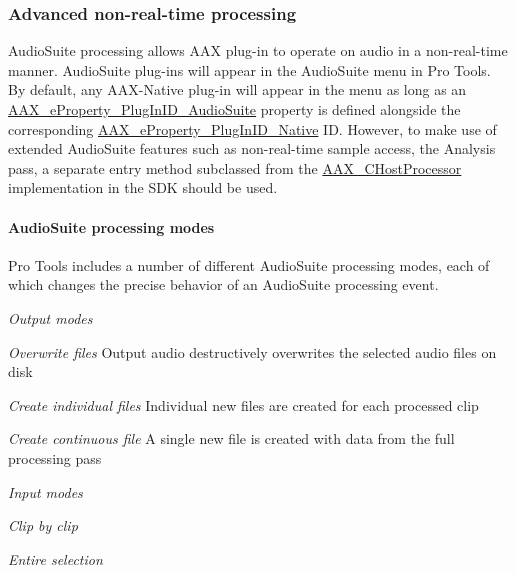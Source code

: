 \hypertarget{a00830_subsection__advanced_non-real-time_processing}{}\subsubsection{Advanced non-\/real-\/time processing}\label{a00830_subsection__advanced_non-real-time_processing}
 Audio\+Suite processing allows A\+AX plug-\/in to operate on audio in a non-\/real-\/time manner. Audio\+Suite plug-\/ins will appear in the Audio\+Suite menu in Pro Tools. By default, any A\+A\+X-\/\+Native plug-\/in will appear in the menu as long as an \mbox{\hyperlink{a00662_a13e384f22825afd3db6d68395b79ce0dad3344696b8298a8b254add3d039ea927}{A\+A\+X\+\_\+e\+Property\+\_\+\+Plug\+In\+I\+D\+\_\+\+Audio\+Suite}} property is defined alongside the corresponding \mbox{\hyperlink{a00662_a13e384f22825afd3db6d68395b79ce0da89ca3dd6e96895cda14976c1b1ceb826}{A\+A\+X\+\_\+e\+Property\+\_\+\+Plug\+In\+I\+D\+\_\+\+Native}} ID. However, to make use of extended Audio\+Suite features such as non-\/real-\/time sample access, the Analysis pass, a separate entry method subclassed from the \mbox{\hyperlink{a01485}{A\+A\+X\+\_\+\+C\+Host\+Processor}} implementation in the S\+DK should be used.

\hypertarget{a00830_subsubsection__audiosuite_processing_modes_}{}\paragraph{Audio\+Suite processing modes}\label{a00830_subsubsection__audiosuite_processing_modes_}
 Pro Tools includes a number of different Audio\+Suite processing modes, each of which changes the precise behavior of an Audio\+Suite processing event.

{\itshape Output modes } 
\begin{DoxyItemize}
\item {\itshape  Overwrite files} Output audio destructively overwrites the selected audio files on disk  
\item {\itshape  Create individual files} Individual new files are created for each processed clip  
\item {\itshape  Create continuous file} A single new file is created with data from the full processing pass  
\end{DoxyItemize}

{\itshape Input modes } 
\begin{DoxyItemize}
\item {\itshape  Clip by clip}  
\item {\itshape  Entire selection}  
\end{DoxyItemize}

